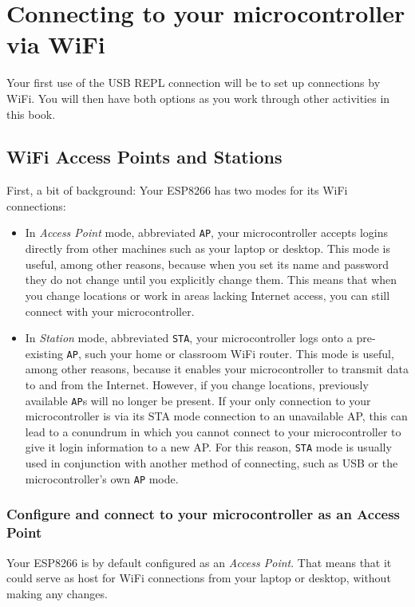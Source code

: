 	  
	  
\section{Connecting to your microcontroller via WiFi}
Your first use of the USB REPL connection will be to set up connections by WiFi. 
You will then have both options as you work through other activities in this book.

\subsection{WiFi Access Points and Stations}
First, a bit of background: Your ESP8266 has two modes for its WiFi connections: 
\begin{itemize}
	\item In \emph{Access Point} mode, abbreviated \texttt{AP}, your microcontroller accepts logins directly from other machines such as your laptop or desktop. 
	This mode is useful, among other reasons, because when you set its name and password they do not change until you explicitly change them. 
	This means that when you change locations or work in areas lacking Internet access, you can still connect with your microcontroller. 
	
	\item In \emph{Station} mode, abbreviated \texttt{STA}, your microcontroller logs onto a pre-existing \texttt{AP}, such your home or classroom WiFi router.
	This mode is useful, among other reasons, because it enables your microcontroller to transmit data to and from the Internet. 
	However, if you change locations, previously available \texttt{AP}s will no longer be present.
	If your only connection to your microcontroller is via its STA mode connection to an unavailable AP, this can lead to a conundrum in which you cannot connect to your microcontroller to give it login information to a new AP. 
	For this reason, \texttt{STA} mode is usually used in conjunction with another method of connecting, such as USB or the microcontroller's own \texttt{AP} mode.

\end{itemize}
\subsubsection{\howto Configure and connect to your microcontroller as an Access Point}
Your ESP8266 is by default configured as an \emph{Access Point}. 
That means that it could serve as host for WiFi connections from your laptop or desktop, without making any changes. 

